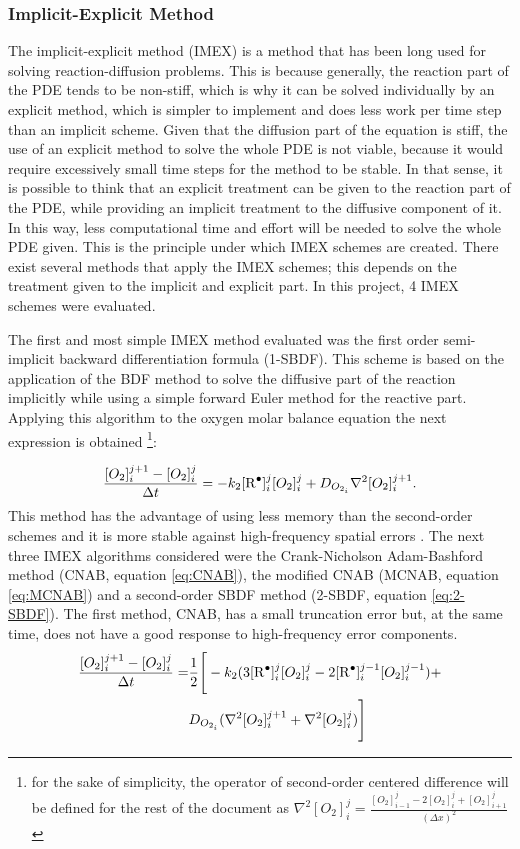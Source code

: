 \begin{refsection}
\subsubsection{Implicit-Explicit Method}
The implicit-explicit method (IMEX) is a method that has been long used for solving reaction-diffusion problems. This is because generally, the reaction part of the PDE tends to be non-stiff, which is why it can be solved individually by an explicit method, which is simpler to implement and does less work per time step than an implicit scheme. Given that the diffusion part of the equation is stiff, the use of an explicit method to solve the whole PDE is not viable, because it would require excessively small time steps for the method to be stable. In that sense, it is possible to think that an explicit treatment can be given to the reaction part of the PDE, while providing an implicit treatment to the diffusive component of it. In this way, less computational time and effort will be needed to solve the whole PDE given. This is the principle under which IMEX schemes are created. There exist several methods that apply the IMEX schemes; this depends on the treatment given to the implicit and explicit part. In this project, 4 IMEX schemes were evaluated.

The first and most simple IMEX method evaluated was the first order semi-implicit backward differentiation formula (1-SBDF). This scheme is based on the application of the BDF method to solve the diffusive part of the reaction implicitly while using a simple forward Euler method for the reactive part. Applying this algorithm to the oxygen molar balance equation the next expression is obtained \footnote{for the sake of simplicity, the operator of second-order centered difference will be defined for the rest of the document as $\nabla^2 [O_2]^j_i=\frac{[O_2]_{i-1}^{j}-2[O_2]_{i}^{j}+[O_2]_{i+1}^{j}}{(\Delta x)^2}$}:

\begin{equation}
   \frac{[O_2]^{j+1}_i-[O_2]^j_i}{\Delta t}=-k_2[\ce{R^.}]_i^{j}[O_2]_i^{j}+ D_{O_{2_i}}\nabla^2[O_2]_i^{j+1}.
\end{equation}
This method has the advantage of using less memory than the second-order schemes and it is more stable against high-frequency spatial errors \cite{Ruuth1995Implicit-explicitFormation}. The next three IMEX algorithms considered were the Crank-Nicholson Adam-Bashford method (CNAB, equation \ref{eq:CNAB}), the modified CNAB (MCNAB, equation \ref{eq:MCNAB}) and a second-order SBDF method (2-SBDF, equation \ref{eq:2-SBDF}). The first method, CNAB, has a small truncation error but, at the same time, does not have a good response to high-frequency error components.
    \begin{align}
    \frac{[O_2]^{j+1}_i-[O_2]^j_i}{\Delta t}=& \frac{1}{2}\Biggr[-k_2(3[\ce{R^.}]_i^{j}[O_2]_i^{j}-2[\ce{R^.}]_i^{j-1}[O_2]_i^{j-1})+\nonumber\\ &D_{O_{2_i}}(\nabla^2[O_2]_i^{j+1}+\nabla^2[O_2]_i^{j})\Biggr]
    \label{eq:CNAB}
    \end{align}
    

\end{refsection}
